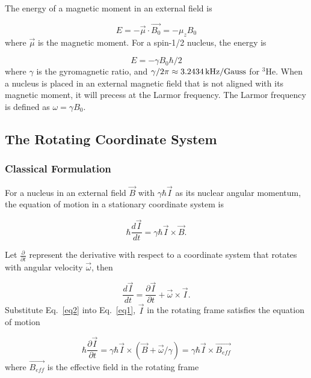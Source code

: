 The energy of a magnetic moment in an external field is

\begin{equation}
E = -\vec{\mu}\cdot \vec{B_{0}} = -\mu_{z}B_{0}
\end{equation}
where $\vec{\mu}$ is the magnetic moment. For a spin-1/2 nucleus, the energy is

\begin{equation}
E = -\gamma B_{0}\hbar/2
\end{equation}
where $\gamma$ is the gyromagnetic ratio, and $\gamma /2\pi \approx 3.2434\,{\rm kHz/Gauss}$ for $^3$He. When a nucleus is placed in an external magnetic field that is not aligned with its magnetic moment, it will precess at the Larmor frequency. The Larmor frequency is defined as $\omega=\gamma B_{0}$.

\subsection{The Rotating Coordinate System}

\subsubsection{Classical Formulation}

For a nucleus in an external field $\vec{B}$ with $\gamma \hbar \vec{I}$ as its nuclear angular momentum, the equation of motion in a stationary coordinate system is \cite{RevModPhys.26.167}

\begin{equation}\label{eq1}
\hbar \frac{d\vec{I}}{dt}=\gamma \hbar \vec{I} \times \vec{B}.
\end{equation}

Let $\frac{\partial}{\partial t}$ represent the derivative with respect to a coordinate system that rotates with angular velocity $\vec{\omega}$, then

\begin{equation}\label{eq2}
\frac{d\vec{I}}{dt}=\frac{\partial \vec{I}}{\partial t}+\vec{\omega} \times \vec{I}.
\end{equation}
Substitute Eq.~\ref{eq2} into Eq.~\ref{eq1}, $\vec{I}$ in the rotating frame satisfies the equation of motion 

\begin{equation}
\hbar \frac{\partial \vec{I}}{\partial t}=\gamma \hbar \vec{I} \times (\vec{B} + \vec{\omega}/\gamma)=\gamma \hbar \vec{I} \times \vec{B_{eff}}
\end{equation}
where $\vec{B_{eff}}$ is the effective field in the rotating frame

